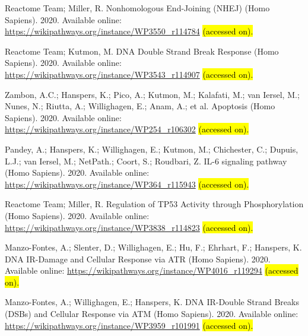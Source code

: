 \documentclass[ijms,article,accept,moreauthors,pdftex]{Definitions/mdpi}
\begin{document}
\begin{thebibliography}{999}
{Reactome Team}; Miller, R.
\newblock Nonhomologous End-Joining (NHEJ) (Homo Sapiens).  2020.
\newblock Available online: \url{https://wikipathways.org/instance/WP3550_r114784} \hl{(accessed on). } %

{Reactome Team}; Kutmon, M.
\newblock DNA Double Strand Break Response (Homo Sapiens).  2020.
\newblock Available online: \url{https://wikipathways.org/instance/WP3543_r114907} \hl{(accessed on). } %

Zambon, A.C.; Hanspers, K.; Pico, A.; Kutmon, M.; Kalafati, M.; van Iersel, M.;
  Nunes, N.; Riutta, A.; Willighagen, E.; Anam, A.; et al.
\newblock Apoptosis (Homo Sapiens).  2020.
\newblock Available online: \url{https://wikipathways.org/instance/WP254_r106302} \hl{(accessed on). } %

Pandey, A.; Hanspers, K.;  Willighagen, E.; Kutmon, M.; Chichester,
  C.; Dupuis, L.J.; van Iersel, M.; NetPath.; Coort, S.; Roudbari, Z.
\newblock IL-6 signaling pathway (Homo Sapiens).  2020.
\newblock Available online: \url{https://wikipathways.org/instance/WP364_r115943} \hl{(accessed on). } %

{Reactome Team}; Miller, R.
\newblock Regulation of TP53 Activity through Phosphorylation (Homo Sapiens).  2020.
\newblock Available online: \url{https://wikipathways.org/instance/WP3838_r114823} \hl{(accessed on). } %

Manzo-Fontes, A.; Slenter, D.; Willighagen, E.; Hu, F.; Ehrhart, F.; Hanspers,
  K.
\newblock DNA IR-Damage and Cellular Response via ATR (Homo Sapiens).  2020.
\newblock Available online: \url{https://wikipathways.org/instance/WP4016_r119294} \hl{(accessed on). } %

Manzo-Fontes, A.; Willighagen, E.; Hanspers, K.
\newblock DNA IR-Double Strand Breaks (DSBs) and Cellular Response via ATM
  (Homo Sapiens).  2020.
\newblock Available online: \url{https://wikipathways.org/instance/WP3959_r101991} \hl{(accessed on). } %


\end{thebibliography}
\end{document}
